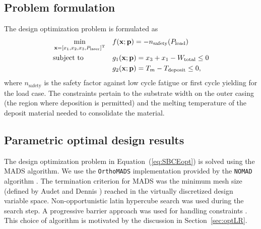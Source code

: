 \subsection{Problem formulation} \label{subsec:SBDproblemformulation}

The design optimization problem is formulated as 
\begin{equation}
	\label{eq:SBCEopt}
	\begin{aligned}
		& \min_{\mathbf{x} = \left[x_1,x_2,x_3,P_{\textrm{laser}}\right]^{\text T}}
		& & f(\mathbf{x};\mathbf{p}) = -n_{\textrm{safety}}(P_{\textrm{load}})\\
		& \text{subject to}
		& & g_1(\mathbf{x};\mathbf{p}) = x_3 + x_1 - W_{\textrm{total}} \le 0\\
		& & & g_2(\mathbf{x};\mathbf{p}) = T_m - T_\textrm{deposit} \le 0,
	\end{aligned}
\end{equation}
where $n_{\textrm{safety}}$ is the safety factor against low cycle fatigue or first cycle yielding for the load case. The constraints pertain to the substrate width on the outer casing (the region where deposition is permitted) and the melting temperature of the deposit material needed to consolidate the material.

\subsection{Parametric optimal design results} \label{subsec:reduceddesignspace}

The design optimization problem in Equation~(\ref{eq:SBCEopt}) is solved using the \ac{MADS} algorithm. We use the \texttt{OrthoMADS} implementation provided by the \texttt{NOMAD} algorithm \cite{LeDigabel2011}. The termination criterion for \ac{MADS} was the minimum mesh size (defined by Audet and Dennis \cite{Audet2006a}) reached in the virtually discretized design variable space. Non-opportunistic latin hypercube search was used during the search step. A progressive barrier approach was used for handling constraints \cite{Audet2009}. {\color{red} This choice of algorithm is motivated by the discussion in Section~\ref{sec:optLR}.}

